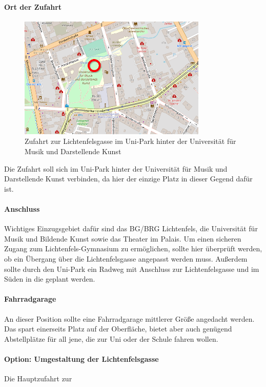 \paragraph{Ort der Zufahrt}
\begin{figure}
    \centering
    \includegraphics[width=0.8\textwidth]{main/bike/tunnel/uni/zufahrt_lichtenfelsgasse}
    \caption[Zufahrt Lichtenfelsgasse]{Zufahrt zur Lichtenfelsgasse im Uni-Park hinter der Universität für Musik und Darstellende Kunst}
\end{figure}

Die Zufahrt soll sich im Uni-Park hinter der Universität für Musik und Darstellende Kunst verbinden, da hier der einzige Platz in dieser Gegend dafür ist.

\paragraph{Anschluss}
Wichtiges Einzugsgebiet dafür sind das BG/BRG Lichtenfels, die Universität für Musik und Bildende Kunst sowie das Theater im Palais. Um einen sicheren Zugang zum Lichtenfels-Gymnasium zu ermöglichen, sollte hier überprüft werden, ob ein Übergang über die Lichtenfelsgasse angepasst werden muss. Außerdem sollte durch den Uni-Park ein Radweg mit Anschluss zur Lichtenfelsgasse und im Süden in die  geplant werden.

\paragraph{Fahrradgarage}
An dieser Position sollte eine Fahrradgarage mittlerer Größe angedacht werden. Das spart einerseits Platz auf der Oberfläche, bietet aber auch genügend Abstellplätze für all jene, die zur Uni oder der Schule fahren wollen.

\paragraph{Option: Umgestaltung der Lichtenfelsgasse}
Die Hauptzufahrt zur 

